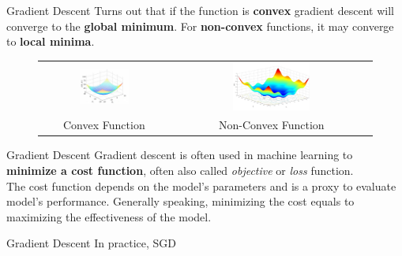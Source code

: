 \documentclass[aspectratio=169]{beamer}
\begin{document}
\begin{frame}{Gradient Descent}
Turns out that if the function is \textbf{convex} gradient descent will converge to the \textbf{global minimum}. For \textbf{non-convex} functions, it may converge to \textbf{local minima}.
\begin{figure}
\begin{tabular}{cc}
\includegraphics[width=0.4\textwidth]{img/sgd/convex_function.png} &
\includegraphics[width=0.4\textwidth]{img/sgd/non_convex_function.jpg}\\
Convex Function & Non-Convex Function
\end{tabular}
\end{figure}
\end{frame}


\begin{frame}{Gradient Descent}
Gradient descent is often used in machine learning to \textbf{minimize a cost function}, often also called \textit{objective} or \textit{loss} function.\\
\vspace{0.5cm}
The cost function depends on the model's parameters and is a proxy to evaluate model's performance. Generally speaking, minimizing the cost equals to maximizing the effectiveness of the model.

\end{frame}


\begin{frame}{Gradient Descent}
In practice, SGD

\end{frame}
\end{document}
